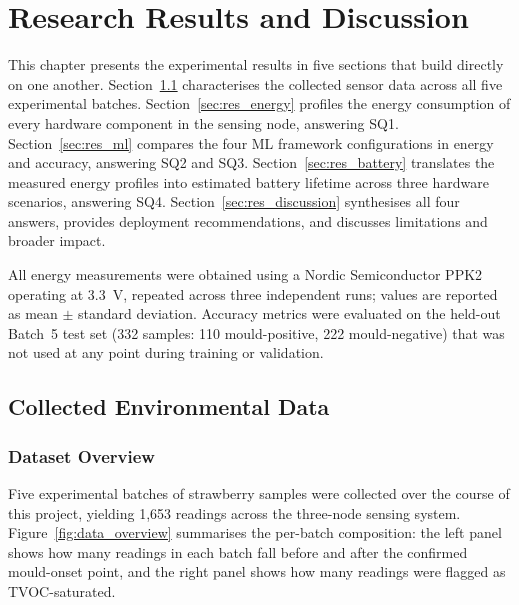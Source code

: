 \chapter{Research Results and Discussion}\label{chap:research_results}

This chapter presents the experimental results in five sections that build directly on one another. Section~\ref{sec:res_data} characterises the collected sensor data across all five experimental batches. Section~\ref{sec:res_energy} profiles the energy consumption of every hardware component in the sensing node, answering SQ1. Section~\ref{sec:res_ml} compares the four ML framework configurations in energy and accuracy, answering SQ2 and SQ3. Section~\ref{sec:res_battery} translates the measured energy profiles into estimated battery lifetime across three hardware scenarios, answering SQ4. Section~\ref{sec:res_discussion} synthesises all four answers, provides deployment recommendations, and discusses limitations and broader impact.

All energy measurements were obtained using a Nordic Semiconductor PPK2 operating at \SI{3.3}{\volt}, repeated across three independent runs; values are reported as mean $\pm$ standard deviation. Accuracy metrics were evaluated on the held-out Batch~5 test set (332 samples: 110 mould-positive, 222 mould-negative) that was not used at any point during training or validation.

\section{Collected Environmental Data}\label{sec:res_data}

\subsection{Dataset Overview}\label{subsec:res_dataset_overview}

Five experimental batches of strawberry samples were collected over the course of this project, yielding 1,653 readings across the three-node sensing system. Figure~\ref{fig:data_overview} summarises the per-batch composition: the left panel shows how many readings in each batch fall before and after the confirmed mould-onset point, and the right panel shows how many readings were flagged as TVOC-saturated.

